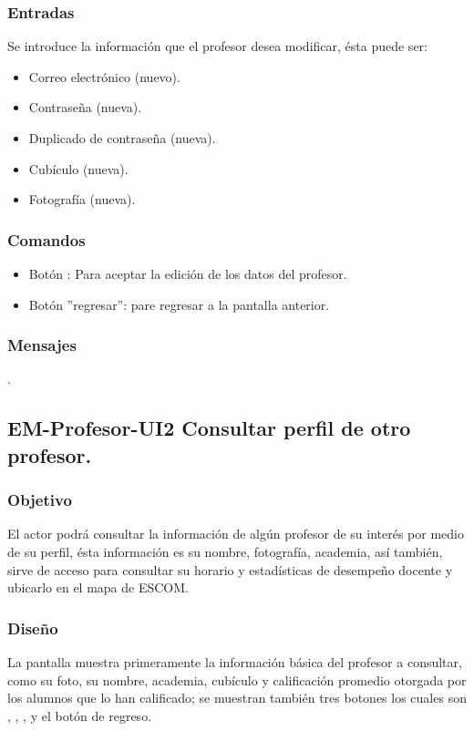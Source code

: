 \subsubsection{Entradas}
	\noindent
	Se introduce la información que el profesor desea modificar, ésta puede ser:
	\begin{itemize}
		\item Correo electrónico (nuevo).
		\item Contraseña (nueva).
		\item Duplicado de contraseña (nueva). 
		\item Cubículo (nueva).
		\item Fotografía (nueva). 
	\end{itemize}

\subsubsection{Comandos}
	\begin{itemize}
		\item Botón : Para aceptar la edición de los datos del profesor.
		\item Botón ''regresar'': pare regresar a la pantalla anterior.
	\end{itemize}

\subsubsection{Mensajes}
	\begin{Citemize}
		\item {}.
	\end{Citemize}

\subsection{EM-Profesor-UI2 Consultar perfil de otro profesor.}

\subsubsection{Objetivo}
	\noindent
	El actor podrá consultar la información de algún profesor de su interés por medio de su perfil, ésta información es su nombre, fotografía, academia, así también, sirve de acceso para consultar su horario y estadísticas de desempeño docente y ubicarlo en el mapa de ESCOM.


\subsubsection{Diseño}
	\noindent
	La pantalla muestra primeramente la información básica del profesor a consultar, como su foto, su nombre, academia, cubículo y calificación promedio otorgada por los alumnos que lo han calificado; se muestran también tres botones los cuales son , , ,  y el botón de regreso.

